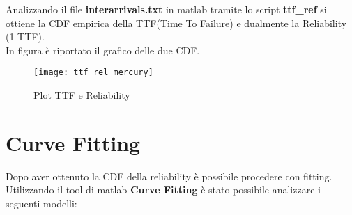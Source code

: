 Analizzando il file \textbf{interarrivals.txt} in matlab tramite lo script \textbf{ttf\_ref}
si ottiene la CDF empirica della TTF(Time To Failure) e dualmente la Reliability (1-TTF).\\
In figura è riportato il grafico delle due CDF.

\begin{figure}[!htbp]
  \texttt{[image: ttf\_rel\_mercury]}
  \caption{Plot TTF e Reliability}
  \label{ttf_rel_mercury}
\end{figure}

\section{Curve Fitting}

Dopo aver ottenuto la CDF della reliability è possibile procedere con fitting.\\
Utilizzando il tool di matlab \textbf{Curve Fitting} è stato possibile
analizzare i seguenti modelli:

\clearpage

